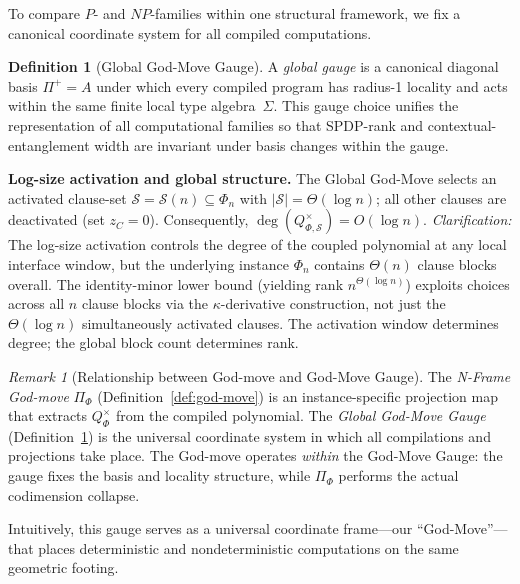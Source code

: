 \documentclass[12pt]{article}
\theoremstyle{definition}
\newtheorem{definition}{Definition}
\theoremstyle{definition}
\theoremstyle{remark}
\newtheorem{remark}{Remark}
\theoremstyle{remark}
\begin{document}
To compare $P$- and $NP$-families within one structural framework, we fix a canonical
coordinate system for all compiled computations.

\begin{definition}[Global God-Move Gauge]
\label{def:god-move-gauge}
A \emph{global gauge} is a canonical diagonal basis $\Pi^+=A$ under which every compiled
program has radius-1 locality and acts within the same finite local type algebra~$\Sigma$.
This gauge choice unifies the representation of all computational families so that
SPDP-rank and contextual-entanglement width are invariant under basis changes within the gauge.
\end{definition}

\noindent\textbf{Log-size activation and global structure.}
The Global God-Move selects an activated clause-set $\mathcal S=\mathcal S(n)\subseteq\Phi_n$
with $|\mathcal S|=\Theta(\log n)$; all other clauses are deactivated (set $z_C=0$).
Consequently, $\deg(Q^{\times}_{\Phi,\mathcal S}) = O(\log n)$.
\emph{Clarification:} The log-size activation controls the degree of the coupled polynomial at any local interface window, but the underlying instance $\Phi_n$ contains $\Theta(n)$ clause blocks overall. The identity-minor lower bound (yielding rank $n^{\Theta(\log n)}$) exploits choices across all $n$ clause blocks via the $\kappa$-derivative construction, not just the $\Theta(\log n)$ simultaneously activated clauses. The activation window determines degree; the global block count determines rank.

\begin{remark}[Relationship between God-move and God-Move Gauge]
The \emph{N-Frame God-move} $\Pi_\Phi$ (Definition~\ref{def:god-move}) is an instance-specific
projection map that extracts $Q^{\times}_\Phi$ from the compiled polynomial. The \emph{Global God-Move Gauge}
(Definition~\ref{def:god-move-gauge}) is the universal coordinate system in which all compilations
and projections take place. The God-move operates \emph{within} the God-Move Gauge: the gauge
fixes the basis and locality structure, while $\Pi_\Phi$ performs the actual codimension collapse.
\end{remark}

Intuitively, this gauge serves as a universal coordinate frame---our ``God-Move''---that
places deterministic and nondeterministic computations on the same geometric footing.
\end{document}
